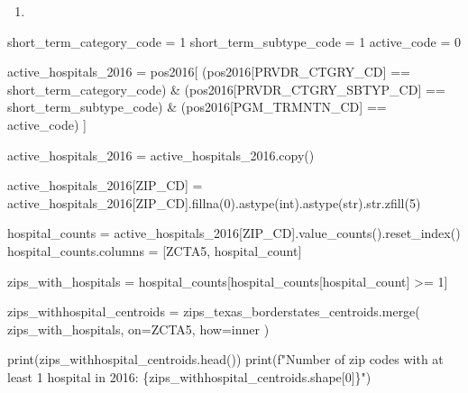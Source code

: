 \documentclass[
  letterpaper,
  DIV=11,
  numbers=noendperiod]{scrartcl}
\newenvironment{Shaded}{\begin{snugshade}}{\end{snugshade}}
\newcommand{\BuiltInTok}[1]{\textcolor[rgb]{0.00,0.23,0.31}{#1}}
\newcommand{\DecValTok}[1]{\textcolor[rgb]{0.68,0.00,0.00}{#1}}
\newcommand{\NormalTok}[1]{\textcolor[rgb]{0.00,0.23,0.31}{#1}}
\newcommand{\OperatorTok}[1]{\textcolor[rgb]{0.37,0.37,0.37}{#1}}
\newcommand{\SpecialCharTok}[1]{\textcolor[rgb]{0.37,0.37,0.37}{#1}}
\newcommand{\SpecialStringTok}[1]{\textcolor[rgb]{0.13,0.47,0.30}{#1}}
\newcommand{\StringTok}[1]{\textcolor[rgb]{0.13,0.47,0.30}{#1}}
\providecommand{\tightlist}{%
  \setlength{\itemsep}{0pt}\setlength{\parskip}{0pt}}\usepackage{longtable,booktabs,array}
\begin{document}
\begin{enumerate}
\def\labelenumi{\arabic{enumi}.}
\setcounter{enumi}{2}
\tightlist
\item
\end{enumerate}

\begin{Shaded}
\begin{Highlighting}[]
\NormalTok{short\_term\_category\_code }\OperatorTok{=} \DecValTok{1}
\NormalTok{short\_term\_subtype\_code }\OperatorTok{=} \DecValTok{1}
\NormalTok{active\_code }\OperatorTok{=} \DecValTok{0}

\NormalTok{active\_hospitals\_2016 }\OperatorTok{=}\NormalTok{ pos2016[}
\NormalTok{    (pos2016[}\StringTok{\textquotesingle{}PRVDR\_CTGRY\_CD\textquotesingle{}}\NormalTok{] }\OperatorTok{==}\NormalTok{ short\_term\_category\_code) }\OperatorTok{\&}
\NormalTok{    (pos2016[}\StringTok{\textquotesingle{}PRVDR\_CTGRY\_SBTYP\_CD\textquotesingle{}}\NormalTok{] }\OperatorTok{==}\NormalTok{ short\_term\_subtype\_code) }\OperatorTok{\&}
\NormalTok{    (pos2016[}\StringTok{\textquotesingle{}PGM\_TRMNTN\_CD\textquotesingle{}}\NormalTok{] }\OperatorTok{==}\NormalTok{ active\_code)}
\NormalTok{]}

\NormalTok{active\_hospitals\_2016 }\OperatorTok{=}\NormalTok{ active\_hospitals\_2016.copy()}

\NormalTok{active\_hospitals\_2016[}\StringTok{\textquotesingle{}ZIP\_CD\textquotesingle{}}\NormalTok{] }\OperatorTok{=}\NormalTok{ active\_hospitals\_2016[}\StringTok{\textquotesingle{}ZIP\_CD\textquotesingle{}}\NormalTok{].fillna(}\DecValTok{0}\NormalTok{).astype(}\BuiltInTok{int}\NormalTok{).astype(}\BuiltInTok{str}\NormalTok{).}\BuiltInTok{str}\NormalTok{.zfill(}\DecValTok{5}\NormalTok{)}

\NormalTok{hospital\_counts }\OperatorTok{=}\NormalTok{ active\_hospitals\_2016[}\StringTok{\textquotesingle{}ZIP\_CD\textquotesingle{}}\NormalTok{].value\_counts().reset\_index()}
\NormalTok{hospital\_counts.columns }\OperatorTok{=}\NormalTok{ [}\StringTok{\textquotesingle{}ZCTA5\textquotesingle{}}\NormalTok{, }\StringTok{\textquotesingle{}hospital\_count\textquotesingle{}}\NormalTok{]}

\NormalTok{zips\_with\_hospitals }\OperatorTok{=}\NormalTok{ hospital\_counts[hospital\_counts[}\StringTok{\textquotesingle{}hospital\_count\textquotesingle{}}\NormalTok{] }\OperatorTok{\textgreater{}=} \DecValTok{1}\NormalTok{]}

\NormalTok{zips\_withhospital\_centroids }\OperatorTok{=}\NormalTok{ zips\_texas\_borderstates\_centroids.merge(}
\NormalTok{    zips\_with\_hospitals, on}\OperatorTok{=}\StringTok{\textquotesingle{}ZCTA5\textquotesingle{}}\NormalTok{, how}\OperatorTok{=}\StringTok{\textquotesingle{}inner\textquotesingle{}}
\NormalTok{)}

\BuiltInTok{print}\NormalTok{(zips\_withhospital\_centroids.head())}
\BuiltInTok{print}\NormalTok{(}\SpecialStringTok{f"Number of zip codes with at least 1 hospital in 2016: }\SpecialCharTok{\{}\NormalTok{zips\_withhospital\_centroids}\SpecialCharTok{.}\NormalTok{shape[}\DecValTok{0}\NormalTok{]}\SpecialCharTok{\}}\SpecialStringTok{"}\NormalTok{)}
\end{Highlighting}
\end{Shaded}
\end{document}
